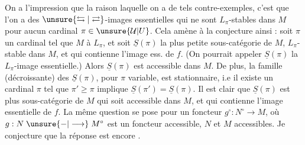On a l'impression que la raison  laquelle
on a de tels contre-exemples, c'est que
l'on a des $\unsure{\leftrightarrows|\rightleftarrows}$-images essentielles qui ne sont
 $L_\pi$-stables dans $M$ pour aucun
cardinal $\pi\in\unsure{\mathcal U|U}$. Cela amène à 
la conjecture ainsi : soit $\pi$ un cardinal
tel que $M$  à $L_\pi$, et soit
$\underline S(\pi)$ la plus petite sous-catégorie  de
$M$, $L_\pi$-stable dans $M$, et qui contienne
l'image ess. de $f$. (On pourrait appeler
$\underline S(\pi)$ la $L_\pi$-image essentielle.) Alors $\underline S(\pi)$
est accessible dans $M$. De plus, la famille
(décroissante) des $\underline S(\pi)$, pour $\pi$ variable,
est stationnaire, i.e il existe un cardinal
$\pi$ tel que $\pi'\geq\pi$ implique $\underline S(\pi')=\underline S(\pi)$.
Il est clair  que $\underline S(\pi)$ est  plus 
sous-catégorie de $M$ qui soit accessible dans $M$,
et qui contienne l'image essentielle de
$f$. La même question se pose pour
un foncteur $g^{\circ}:N^{\circ}\longrightarrow M$, où $g:N\mathrel{\unsure{-|\longrightarrow}}M^{\circ}$
est un foncteur accessible, $N$ et $M$ accessibles.
Je conjecture que la réponse est encore
.
